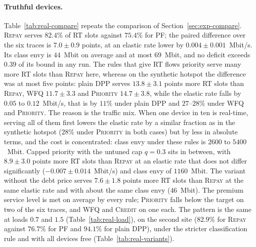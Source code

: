 \documentclass[preprint,11pt]{elsarticle}
\theoremstyle{definition}
\theoremstyle{remark}
\newcommand{\repay}{\textsc{Repay}}
\begin{document}
\paragraph{Truthful devices.}
Table~\ref{tab:real-compare} repeats the comparison of Section~\ref{sec:exp-compare}.
\repay{} serves $82.4\%$ of RT slots against $75.4\%$ for \textsc{PF}; the paired difference over the six traces is $7.0\pm0.9$ points, at an elastic rate lower by $0.004\pm0.001$~Mbit/s.
Its class envy is $44$~Mbit on average and at most $69$~Mbit, and no deficit exceeds $0.39$ of its bound in any run.
The rules that give RT flows priority serve many more RT slots than \repay{} here, whereas on the synthetic hotspot the difference was at most five points: plain DPP serves $13.8\pm3.1$ points more RT slots than \repay{}, \textsc{WFQ} $11.7\pm3.3$ and \textsc{Priority} $14.7\pm3.8$, while the elastic rate falls by $0.05$ to $0.12$~Mbit/s, that is by $11\%$ under plain DPP and $27$--$28\%$ under \textsc{WFQ} and \textsc{Priority}.
The reason is the traffic mix. When one device in ten is real-time, serving all of them first lowers the elastic rate by a similar fraction as in the synthetic hotspot ($28\%$ under \textsc{Priority} in both cases) but by less in absolute terms, and the cost is concentrated: class envy under these rules is $2600$ to $5400$~Mbit.
Capped priority with the untuned cap $q=0.3$ sits in between, with $8.9\pm3.0$ points more RT slots than \repay{} at an elastic rate that does not differ significantly ($-0.007\pm0.014$~Mbit/s) and class envy of $1160$~Mbit.
The variant without the debt price serves $7.6\pm1.8$ points more RT slots than \repay{} at the same elastic rate and with about the same class envy ($46$~Mbit).
The premium service level is met on average by every rule; \textsc{Priority} falls below the target on two of the six traces, and \textsc{WFQ} and \textsc{Credit} on one each.
The pattern is the same at loads $0.7$ and $1.5$ (Table~\ref{tab:real-load}), on the second site ($82.9\%$ for \repay{} against $76.7\%$ for \textsc{PF} and $94.1\%$ for plain DPP), under the stricter classification rule and with all devices free (Table~\ref{tab:real-variants}).
\end{document}

